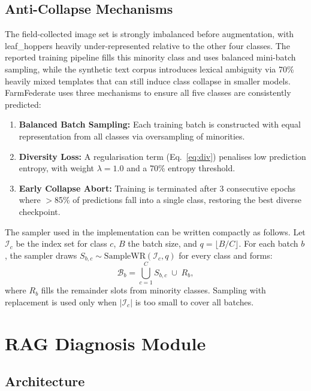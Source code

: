 \documentclass[12pt, a4paper, oneside]{Thesis}
\begin{document}
\section{Anti-Collapse Mechanisms}

The field-collected image set is strongly imbalanced before augmentation, with
leaf\_hoppers heavily under-represented relative to the other four classes.
The reported training pipeline fills this minority class and uses balanced
mini-batch sampling, while the synthetic text corpus introduces
lexical ambiguity via 70\% heavily mixed
templates that can still induce class collapse in smaller models. FarmFederate uses
three mechanisms to ensure all five classes are consistently predicted:
\begin{enumerate}
  \item \textbf{Balanced Batch Sampling:} Each training batch is constructed with equal
        representation from all classes via oversampling of minorities.
  \item \textbf{Diversity Loss:} A regularisation term (Eq.~\ref{eq:div}) penalises
        low prediction entropy, with weight $\lambda=1.0$ and a 70\% entropy threshold.
  \item \textbf{Early Collapse Abort:} Training is terminated after 3 consecutive epochs
        where $>$85\% of predictions fall into a single class, restoring the best diverse
        checkpoint.
\end{enumerate}

The sampler used in the implementation can be written compactly as follows.
Let $\mathcal{I}_c$ be the index set for class $c$, $B$ the batch size, and
$q=\lfloor B/C\rfloor$. For each batch $b$, the sampler draws
$S_{b,c}\sim\mathrm{SampleWR}(\mathcal{I}_c,q)$ for every class and forms:
\begin{equation}
  \mathcal{B}_b=\bigcup_{c=1}^{C}S_{b,c}\;\cup\;R_b,
  \label{eq:balbatch}
\end{equation}
where $R_b$ fills the remainder slots from minority classes. Sampling with
replacement is used only when $|\mathcal{I}_c|$ is too small to cover all batches.


\chapter{RAG Diagnosis Module}
\label{sec:rag}

\section{Architecture}
\end{document}

